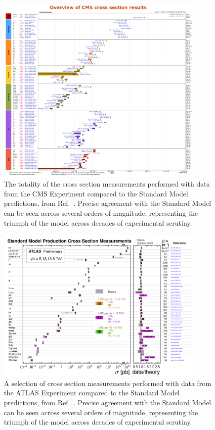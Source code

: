 \begin{figure}[htb]
    \centering
    \includegraphics[width=0.9\textwidth]{fig/cms/cms_xsecs_2023.pdf}
    \caption{
        The totality of the cross section measurements performed with data from the CMS Experiment compared to the Standard Model predictions, from Ref.~\cite{CMSXSecs}. 
        Precise agreement with the Standard Model can be seen across several orders of magnitude, representing the triumph of the model across decades of experimental scrutiny. 
    }
    \label{fig:cms_xsecs}
\end{figure}

\begin{figure}[htb]
    \centering
    \includegraphics[width=0.9\textwidth]{fig/atlas/atlas_xsecs_2023.pdf}
    \caption{
        A selection of cross section measurements performed with data from the ATLAS Experiment compared to the Standard Model predictions, from Ref.~\cite{ATL-PHYS-PUB-2023-039}. 
        Precise agreement with the Standard Model can be seen across several orders of magnitude, representing the triumph of the model across decades of experimental scrutiny. 
    }
    \label{fig:atlas_xsecs}
\end{figure}

